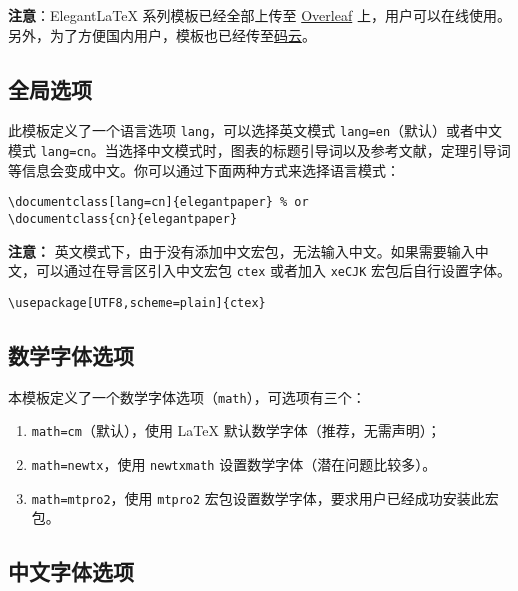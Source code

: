 \documentclass[lang=cn,11pt,a4paper]{elegantpaper}
\begin{document}
\textbf{注意}：Elegant\LaTeX{} 系列模板已经全部上传至 \href{https://www.overleaf.com/latex/templates/elegantpaper-template/yzghrqjhmmmr}{Overleaf} 上，用户可以在线使用。另外，为了方便国内用户，模板也已经传至\href{https://gitee.com/ElegantLaTeX/ElegantPaper}{码云}。


\subsection{全局选项}
此模板定义了一个语言选项 \lstinline{lang}，可以选择英文模式 \lstinline{lang=en}（默认）或者中文模式 \lstinline{lang=cn}。当选择中文模式时，图表的标题引导词以及参考文献，定理引导词等信息会变成中文。你可以通过下面两种方式来选择语言模式：
\begin{lstlisting}
\documentclass[lang=cn]{elegantpaper} % or
\documentclass{cn}{elegantpaper} 
\end{lstlisting}

\textbf{注意：} 英文模式下，由于没有添加中文宏包，无法输入中文。如果需要输入中文，可以通过在导言区引入中文宏包 \lstinline{ctex} 或者加入 \lstinline{xeCJK} 宏包后自行设置字体。 
\begin{lstlisting}
\usepackage[UTF8,scheme=plain]{ctex}
\end{lstlisting}

\subsection{数学字体选项}

本模板定义了一个数学字体选项（\lstinline{math}），可选项有三个：
\begin{enumerate}
  \item \lstinline{math=cm}（默认），使用 \LaTeX{} 默认数学字体（推荐，无需声明）；
  \item \lstinline{math=newtx}，使用 \lstinline{newtxmath} 设置数学字体（潜在问题比较多）。
  \item \lstinline{math=mtpro2}，使用 \lstinline{mtpro2} 宏包设置数学字体，要求用户已经成功安装此宏包。
\end{enumerate}

\subsection{中文字体选项}
\end{document}
